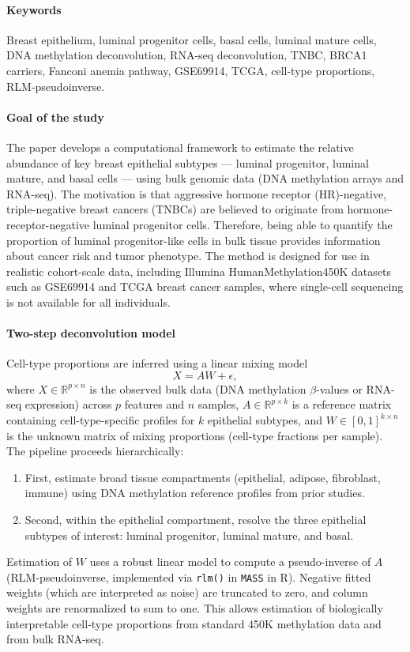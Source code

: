 \documentclass[10pt]{extarticle}
\begin{document}
\paragraph{Keywords}
Breast epithelium, luminal progenitor cells, basal cells, luminal mature cells, DNA methylation deconvolution, RNA-seq deconvolution, TNBC, BRCA1 carriers, Fanconi anemia pathway, GSE69914, TCGA, cell-type proportions, RLM-pseudoinverse\cite{bartlett2021breastepithelial}.

\paragraph{Goal of the study}
The paper develops a computational framework to estimate the relative abundance of key breast epithelial subtypes --- luminal progenitor, luminal mature, and basal cells --- using bulk genomic data (DNA methylation arrays and RNA-seq). The motivation is that aggressive hormone receptor (HR)-negative, triple-negative breast cancers (TNBCs) are believed to originate from hormone-receptor-negative luminal progenitor cells. Therefore, being able to quantify the proportion of luminal progenitor-like cells in bulk tissue provides information about cancer risk and tumor phenotype. The method is designed for use in realistic cohort-scale data, including Illumina HumanMethylation450K datasets such as GSE69914 and TCGA breast cancer samples, where single-cell sequencing is not available for all individuals.

\paragraph{Two-step deconvolution model}
Cell-type proportions are inferred using a linear mixing model
\[
X = A W + \epsilon,
\]
where $X \in \mathbb{R}^{p \times n}$ is the observed bulk data (DNA methylation $\beta$-values or RNA-seq expression) across $p$ features and $n$ samples, $A \in \mathbb{R}^{p \times k}$ is a reference matrix containing cell-type-specific profiles for $k$ epithelial subtypes, and $W \in [0,1]^{k \times n}$ is the unknown matrix of mixing proportions (cell-type fractions per sample).\\
The pipeline proceeds hierarchically:
\begin{enumerate}
    \item First, estimate broad tissue compartments (epithelial, adipose, fibroblast, immune) using DNA methylation reference profiles from prior studies.
    \item Second, within the epithelial compartment, resolve the three epithelial subtypes of interest: luminal progenitor, luminal mature, and basal.
\end{enumerate}
Estimation of $W$ uses a robust linear model to compute a pseudo-inverse of $A$ (RLM-pseudoinverse, implemented via \texttt{rlm()} in \texttt{MASS} in R). Negative fitted weights (which are interpreted as noise) are truncated to zero, and column weights are renormalized to sum to one. This allows estimation of biologically interpretable cell-type proportions from standard 450K methylation data and from bulk RNA-seq.
\end{document}
